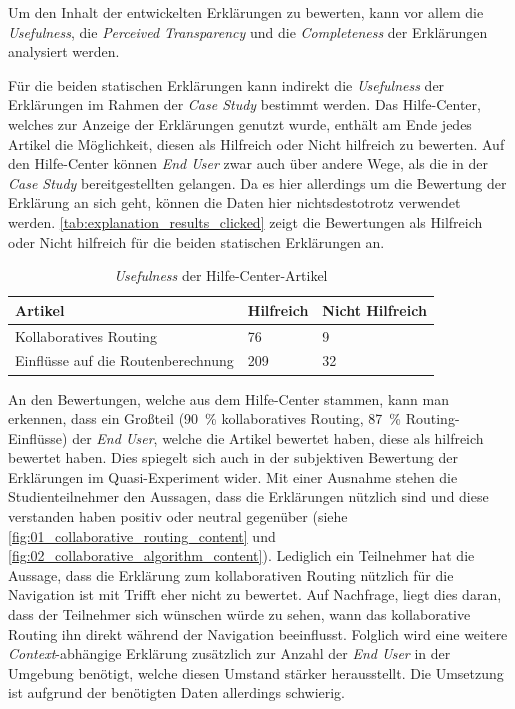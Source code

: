 Um den Inhalt der entwickelten Erklärungen zu bewerten, kann vor allem die \textit{Usefulness}, die \textit{Perceived Transparency} und die \textit{Completeness} der Erklärungen analysiert werden.

Für die beiden statischen Erklärungen kann indirekt die \textit{Usefulness} der Erklärungen im Rahmen der \textit{Case Study} bestimmt werden. Das Hilfe-Center, welches zur Anzeige der Erklärungen genutzt wurde, enthält am Ende jedes Artikel die Möglichkeit, diesen als \glqq Hilfreich\grqq{} oder \glqq Nicht hilfreich\grqq{} zu bewerten. Auf den Hilfe-Center können \textit{End User} zwar auch über andere Wege, als die in der \textit{Case Study} bereitgestellten gelangen. Da es hier allerdings um die Bewertung der Erklärung an sich geht, können die Daten hier nichtsdestotrotz verwendet werden. \autoref{tab:explanation_results_clicked} zeigt die Bewertungen als \glqq Hilfreich\grqq{} oder \glqq Nicht hilfreich\grqq{} für die beiden statischen Erklärungen an.

\begin{table}[htb!]
    \centering
    \begin{tabular}{p{}p{}p{}}
        \hline
        Artikel & Hilfreich & Nicht Hilfreich \\
        \toprule
        Kollaboratives Routing & 76 & 9 \\
        Einflüsse auf die Routenberechnung & 209 & 32 \\
        \bottomrule
    \end{tabular}
    \caption{\textit{Usefulness} der Hilfe-Center-Artikel}
    \label{tab:explanation_results_clicked}
\end{table}

An den Bewertungen, welche aus dem Hilfe-Center stammen, kann man erkennen, dass ein Großteil (90~\% kollaboratives Routing, 87~\% Routing-Einflüsse) der \textit{End User}, welche die Artikel bewertet haben, diese als \glqq hilfreich\grqq{} bewertet haben. Dies spiegelt sich auch in der subjektiven Bewertung der Erklärungen im Quasi-Experiment wider. Mit einer Ausnahme stehen die Studienteilnehmer den Aussagen, dass die Erklärungen nützlich sind und diese verstanden haben positiv oder neutral gegenüber (siehe \autoref{fig:01_collaborative_routing_content} und \autoref{fig:02_collaborative_algorithm_content}). Lediglich ein Teilnehmer hat die Aussage, dass die Erklärung zum kollaborativen Routing nützlich für die Navigation ist mit \glqq Trifft eher nicht zu\grqq{} bewertet. Auf Nachfrage, liegt dies daran, dass der Teilnehmer sich wünschen würde zu sehen, wann das kollaborative Routing ihn direkt während der Navigation beeinflusst. Folglich wird eine weitere \textit{Context}-abhängige Erklärung zusätzlich zur Anzahl der \textit{End User} in der Umgebung benötigt, welche diesen Umstand stärker herausstellt. Die Umsetzung ist aufgrund der benötigten Daten allerdings schwierig.

